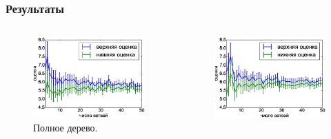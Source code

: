 \documentclass[unicode, notheorems]{beamer}
\begin{document}
\begin{frame}
    \frametitle{Результаты}
    \begin{columns}
        \begin{column}{0.5\textwidth}
            \begin{figure}[h]
                \centering
                \includegraphics[width=\linewidth]{convergence_to_true_value_standard_slides}
                \caption{Полное дерево.}
                \label{fig:true_value_test_standard}
            \end{figure}
        \end{column}
        \begin{column}{0.5\textwidth}
            \begin{figure}[h]
                \centering
                \includegraphics[width=\linewidth]{convergence_to_true_value_random_subtree_slides}

\end{figure}
\end{column}
\end{columns}
\end{frame}
\end{document}
